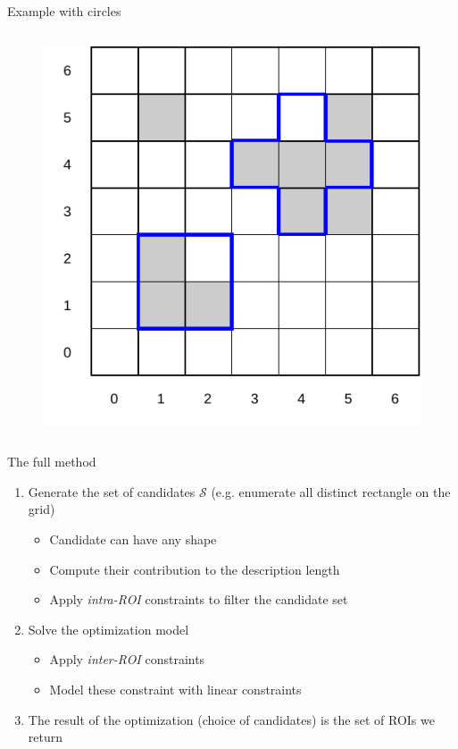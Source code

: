 \documentclass[10pt]{beamer}
\begin{document}
\begin{frame}{Example with circles}
\begin{columns}[T, onlytextwidth]
        \begin{figure}
            \centering
            \includegraphics[scale=0.5]{figures/running-example/MDL/example-3.pdf}
        \end{figure}
    \end{columns}
\end{frame}

\begin{frame}{The full method}
    \begin{enumerate}
        \item Generate the set of candidates $\mathcal{S}$ (e.g. enumerate all distinct
            rectangle on the grid)
            \begin{itemize}
                \item Candidate can have any shape
                \item Compute their contribution to the description length
                \item Apply \emph{intra-ROI} constraints to filter the candidate set
            \end{itemize}
        \item Solve the optimization model
            \begin{itemize}
                \item Apply \emph{inter-ROI} constraints
                \item Model these constraint with linear constraints
            \end{itemize}
        \item The result of the optimization (choice of candidates) is the set of ROIs
            we return
    \end{enumerate}
\end{frame}
\end{document}
